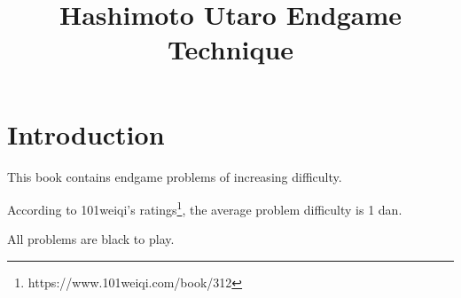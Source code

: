 
\def\problems{%
\p{659/40815}%
\p{659/40816}%
\p{659/40817}%
\p{659/40818}%
\p{659/40819}%
\p{659/40820}%
\p{659/40822}%
\p{659/40823}%
\p{659/40824}%
\p{659/40825}%
\p{659/40826}%
\p{659/40827}%
\p{659/40828}%
\p{659/40829}%
\p{659/40830}%
\p{659/40831}%
\p{659/40833}%
\p{659/40835}%
\p{659/40836}%
\p{659/40837}%
\p{659/40838}%
\p{659/40839}%
\p{659/40840}%
\p{659/40841}%
\p{659/40842}%
\p{659/40843}%
\p{659/40844}%
\p{659/40845}%
\p{659/40846}%
\p{659/40847}%
\p{659/40848}%
\p{659/40849}%
\p{659/40850}%
\p{659/40851}%
\p{659/40852}%
\p{659/40853}%
\p{659/40854}%
\p{659/40856}%
\p{659/40857}%
\p{659/40858}%
\p{659/40859}%
\p{659/40860}%
\p{659/40861}%
\p{659/40862}%
\p{659/40863}%
\p{659/40864}%
\p{659/40865}%
\p{659/40866}%
\p{659/40867}%
\p{659/40868}%
\p{659/40869}%
\p{659/40870}%
\p{659/40871}%
\p{659/40874}%
\p{659/40875}%
\p{659/40876}%
\p{659/40877}%
\p{659/40878}%
\p{659/40879}%
\p{659/40880}%
\p{659/40881}%
\p{659/40882}%
\p{659/40883}%
\p{659/40884}%
\p{659/40885}%
\p{659/40886}%
\p{659/40887}%
\p{659/40888}%
\p{659/40889}%
\p{659/40890}%
\p{659/40891}%
\p{659/40892}%
\p{659/40893}%
\p{659/40894}%
\p{659/40895}%
\p{659/40896}%
\p{659/40897}%
\p{659/40899}%
\p{659/40907}%
\p{659/40908}%
\p{659/40909}%
\p{659/40911}%
\p{659/40912}%
\p{659/40913}%
\p{659/40914}%
\p{659/40915}%
\p{659/40916}%
\p{659/40917}%
\p{659/40918}%
\p{659/40919}%
\p{659/40920}%
\p{659/40921}%
\p{659/40923}%
\p{659/40924}%
\p{659/40925}%
\p{659/40926}%
\p{659/40927}%
\p{659/40928}%
\p{659/40929}%
\p{659/40930}%
\p{659/40931}%
\p{659/40932}%
\p{659/40933}%
\p{659/40934}%
\p{659/40935}%
\p{659/40937}%
\p{659/40938}%
\p{659/40940}%
\halfgoban%
\p{659/40942}%
\p{659/40943}%
\p{659/40821}%
\p{659/40832}%
\p{659/40834}%
\p{659/40855}%
\p{659/40872}%
\p{659/40873}%
\p{659/40898}%
\p{659/40900}%
\p{659/40901}%
\p{659/40902}%
\p{659/40903}%
\p{659/40904}%
\p{659/40905}%
\p{659/40906}%
\p{659/40910}%
\p{659/40922}%
\p{659/40936}%
\p{659/40939}%
\p{659/40941}%
\p{659/40944}%
}



\title{Hashimoto Utaro Endgame Technique}

\chapter*{Introduction}%
\thispagestyle{empty}%
This book contains \countproblems{} endgame problems of increasing difficulty.

According to 101weiqi's ratings\footnote{https://www.101weiqi.com/book/312}, the average problem difficulty is 1 dan.

All problems are black to play.

\renderproblems
\rendersolutions


